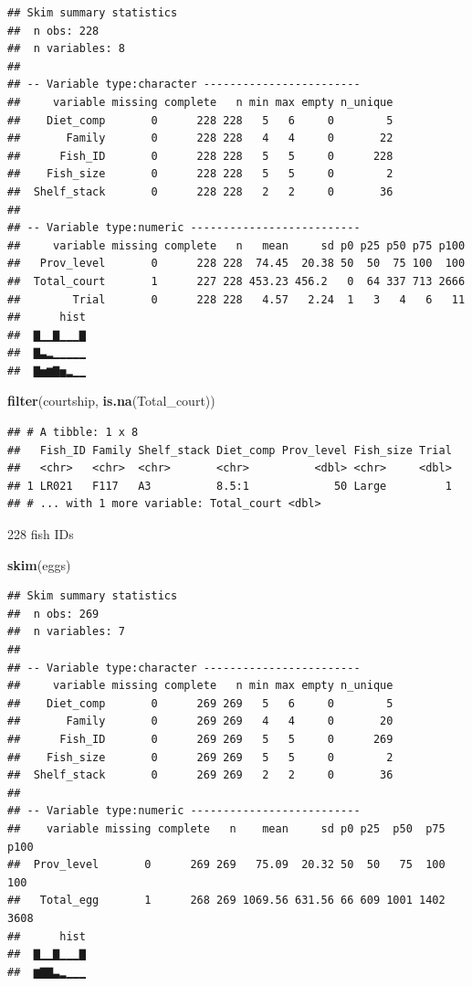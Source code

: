 \documentclass[]{book}
\newenvironment{Shaded}{\begin{snugshade}}{\end{snugshade}}
\newcommand{\KeywordTok}[1]{\textcolor[rgb]{0.13,0.29,0.53}{\textbf{#1}}}
\newcommand{\NormalTok}[1]{#1}
\begin{document}
\begin{verbatim}
## Skim summary statistics
##  n obs: 228 
##  n variables: 8 
## 
## -- Variable type:character ------------------------
##     variable missing complete   n min max empty n_unique
##    Diet_comp       0      228 228   5   6     0        5
##       Family       0      228 228   4   4     0       22
##      Fish_ID       0      228 228   5   5     0      228
##    Fish_size       0      228 228   5   5     0        2
##  Shelf_stack       0      228 228   2   2     0       36
## 
## -- Variable type:numeric --------------------------
##     variable missing complete   n   mean     sd p0 p25 p50 p75 p100
##   Prov_level       0      228 228  74.45  20.38 50  50  75 100  100
##  Total_court       1      227 228 453.23 456.2   0  64 337 713 2666
##        Trial       0      228 228   4.57   2.24  1   3   4   6   11
##      hist
##  ▇▁▁▇▁▁▁▇
##  ▇▃▂▁▁▁▁▁
##  ▇▅▆▇▅▂▁▁
\end{verbatim}

\begin{Shaded}
\begin{Highlighting}[]
\KeywordTok{filter}\NormalTok{(courtship, }\KeywordTok{is.na}\NormalTok{(Total_court))}
\end{Highlighting}
\end{Shaded}

\begin{verbatim}
## # A tibble: 1 x 8
##   Fish_ID Family Shelf_stack Diet_comp Prov_level Fish_size Trial
##   <chr>   <chr>  <chr>       <chr>          <dbl> <chr>     <dbl>
## 1 LR021   F117   A3          8.5:1             50 Large         1
## # ... with 1 more variable: Total_court <dbl>
\end{verbatim}

228 fish IDs

\begin{Shaded}
\begin{Highlighting}[]
\KeywordTok{skim}\NormalTok{(eggs)}
\end{Highlighting}
\end{Shaded}

\begin{verbatim}
## Skim summary statistics
##  n obs: 269 
##  n variables: 7 
## 
## -- Variable type:character ------------------------
##     variable missing complete   n min max empty n_unique
##    Diet_comp       0      269 269   5   6     0        5
##       Family       0      269 269   4   4     0       20
##      Fish_ID       0      269 269   5   5     0      269
##    Fish_size       0      269 269   5   5     0        2
##  Shelf_stack       0      269 269   2   2     0       36
## 
## -- Variable type:numeric --------------------------
##    variable missing complete   n    mean     sd p0 p25  p50  p75 p100
##  Prov_level       0      269 269   75.09  20.32 50  50   75  100  100
##   Total_egg       1      268 269 1069.56 631.56 66 609 1001 1402 3608
##      hist
##  ▇▁▁▇▁▁▁▇
##  ▆▇▇▃▂▁▁▁
\end{verbatim}
\end{document}
